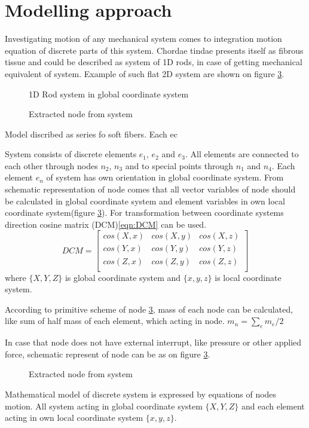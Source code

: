 \section*{Modelling approach}
Investigating motion of any mechanical system comes to integration motion
equation of discrete parts of this system. Chordae tindae presents itself as
fibrous tissue and could be described as system of 1D rods, in case of getting
mechanical equivalent of system. Example of such flat 2D system are shown on
figure \ref{fig:nodeExtract}.
\begin{figure}[H]\label{fig:rodSystem}
  \centering
  
  \caption{1D Rod system in global coordinate system}
\end{figure}
\begin{figure}[H]
  \centering
  
  \caption{Extracted node from system}\label{fig:nodeExtract}
\end{figure}
Model discribed as series fo soft fibers. Each ec


System consists of discrete elements $e_1$, $e_2$ and $e_3$. All elements are
connected to each other through nodes $n_2$, $n_3$ and to special points through
$n_1$ and $n_4$. Each element $e_n$ of system has own orientation in global
coordinate system. 
From schematic representation of node comes that all vector variables of node should be calculated
in global coordinate system and element variables in own local coordinate system(figure
\ref{fig:nodeExtract}). For transformation between coordinate systems direction cosine matrix
(DCM)\eqref{eqn:DCM} can be used.
\begin{equation}\label{eqn:DCM}
  DCM= \begin{bmatrix}
    cos(X,x) & cos(X,y) & cos(X,z) \\
    cos(Y,x) & cos(Y,y) & cos(Y,z) \\
    cos(Z,x) & cos(Z,y) & cos(Z,z) \\
  \end{bmatrix}
\end{equation}
where $\{X, Y, Z\}$ is global coordinate system and $\{x,y,z\}$ is local coordinate
system.\par According to primitive scheme of node \ref{fig:nodeExtract}, mass of
each node can be calculated, like sum of half mass of each element, which acting
in node. $m_n=\sum_{e}m_e/2$\par
In case that node does not have external interrupt, like pressure or other
applied force, schematic represent of node can be as on figure
\ref{fig:nodeExtract}.\par
\begin{figure}[H]
  \centering
  
  \caption{Extracted node from system}\label{fig:nodeExtract}
\end{figure}
Mathematical model of discrete system is expressed by equations of nodes motion.
All system acting in global coordinate system $\{X, Y, Z\}$ and each element acting
in own local coordinate system $\{x,y,z\}$.

